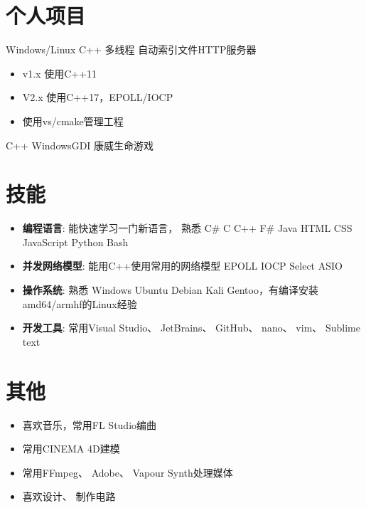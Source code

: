 \documentclass{resume}
\begin{document}
\section{个人项目}
Windows/Linux C++ 多线程 自动索引文件HTTP服务器
\begin{itemize}[parsep=0.25ex]
\item v1.x 使用C++11
\item V2.x 使用C++17，EPOLL/IOCP
\item 使用vs/cmake管理工程
\end{itemize}
C++ WindowsGDI 康威生命游戏
\section{技能}
\begin{itemize}[parsep=0.25ex]
\item
\textbf{编程语言}:
能快速学习一门新语言，
熟悉 C\# C C++ F\# Java HTML CSS JavaScript Python Bash
\item
\textbf{并发网络模型}:
能用C++使用常用的网络模型 EPOLL IOCP Select ASIO
\item
\textbf{操作系统}:
熟悉 Windows Ubuntu Debian Kali Gentoo，有编译安装amd64/armhf的Linux经验
\item
\textbf{开发工具}:
常用Visual Studio、 JetBrains、 GitHub、 nano、 vim、 Sublime text
\end{itemize}
\section{其他}
\begin{itemize}[parsep=0.25ex]
\item 喜欢音乐，常用FL Studio编曲
\item 常用CINEMA 4D建模
\item 常用FFmpeg、 Adobe、 Vapour Synth处理媒体
\item 喜欢设计、 制作电路
\end{itemize}
\end{document}
